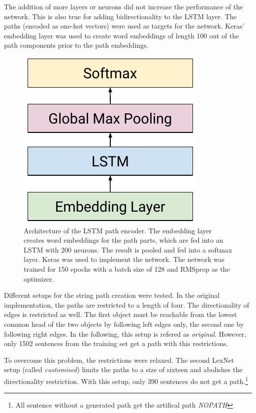 The addition of more layers or neurons did not increase the performance of the network. This is also true for adding bidirectionality to the LSTM layer. The paths (encoded as one-hot vectors) were used as targets for the network. Keras' embedding layer was used to create word embeddings of length 100 out of the path components prior to the path embeddings.

\begin{figure}[h]
\centering
\caption{Architecture of the LSTM path encoder. The embedding layer creates word embeddings for the path parts, which are fed into an LSTM with 200 neurons. The result is pooled and fed into a softmax layer. Keras \cite{chollet2015keras} was used to implement the network. The network was trained for 150 epochs with a batch size of 128 and RMSprop as the optimizer.}
\label{fig:lexnetnn}
\includegraphics{images/lex_arch}
\end{figure}



Different setups for the string path creation were tested. In the original implementation, the paths are restricted to a length of four. The directionality of edges is restricted as well. The first object must be reachable from the lowest common head of the two objects by following left edges only, the second one by following right edges. In the following, this setup is refered as \emph{original}. However, only 1502 sentences from the training set get a path with this restrictions. 

To overcome this problem, the restrictions were relaxed. The second LexNet setup (called \emph{customised}) limits the paths to a size of sixteen and abolishes the directionality restriction. With this setup, only 390 sentences do not get a path.\footnote{All sentence without a generated path get the artifical path \emph{NOPATH}}






